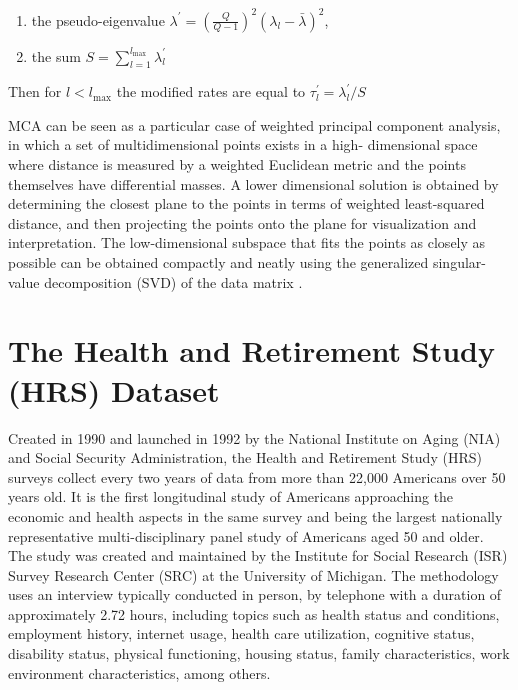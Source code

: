 \documentclass[conference,final,]{IEEEtran}
\begin{document}
\begin{enumerate}
\def\labelenumi{\arabic{enumi}.}
\item
  the pseudo-eigenvalue
  \(\lambda^\prime = \left( \frac{Q}{Q-1} \right)^2(\lambda_l - \bar{\lambda})^2\),
\item
  the sum \(S=\sum_{l=1}^{l_{\max}} \lambda^{\prime} _l\)
\end{enumerate}

Then for \(l < l_{\max}\) the modified rates are equal to
\(\tau^\prime _l = \lambda^\prime_l / S\)

MCA can be seen as a particular case of weighted principal component
analysis, in which a set of multidimensional points exists in a high-
dimensional space where distance is measured by a weighted Euclidean
metric and the points themselves have differential masses. A lower
dimensional solution is obtained by determining the closest plane to the
points in terms of weighted least-squared distance, and then projecting
the points onto the plane for visualization and interpretation. The
low-dimensional subspace that fits the points as closely as possible can
be obtained compactly and neatly using the generalized singular-value
decomposition (SVD) of the data matrix \cite{greenacre2006multiple}.

\hypertarget{the-health-and-retirement-study-hrs-dataset}{%
\section{The Health and Retirement Study (HRS)
Dataset}\label{the-health-and-retirement-study-hrs-dataset}}

Created in 1990 and launched in 1992 by the National Institute on Aging
(NIA) and Social Security Administration, the Health and Retirement
Study (HRS) surveys collect every two years of data from more than
22,000 Americans over 50 years old. It is the first longitudinal study
of Americans approaching the economic and health aspects in the same
survey and being the largest nationally representative
multi-disciplinary panel study of Americans aged 50 and older. The study
was created and maintained by the Institute for Social Research (ISR)
Survey Research Center (SRC) at the University of Michigan. The
methodology uses an interview typically conducted in person, by
telephone with a duration of approximately 2.72 hours, including topics
such as health status and conditions, employment history, internet
usage, health care utilization, cognitive status, disability status,
physical functioning, housing status, family characteristics, work
environment characteristics, among others.
\end{document}
